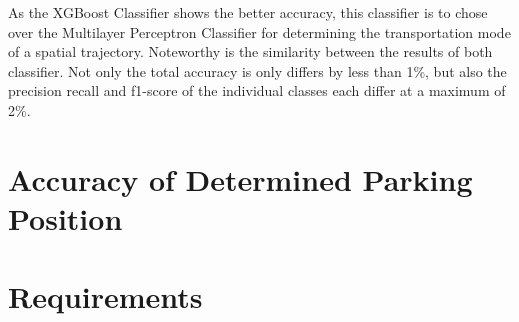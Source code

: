 As the XGBoost Classifier shows the better accuracy, this classifier is to chose over the Multilayer Perceptron Classifier for determining the transportation mode of a spatial trajectory. Noteworthy is the similarity between the results of both classifier. Not only the total accuracy is only differs by less than 1\%, but also the precision recall and f1-score of the individual classes each differ at a maximum of 2\%.
     
\section{Accuracy of Determined Parking Position}


\section{Requirements}



